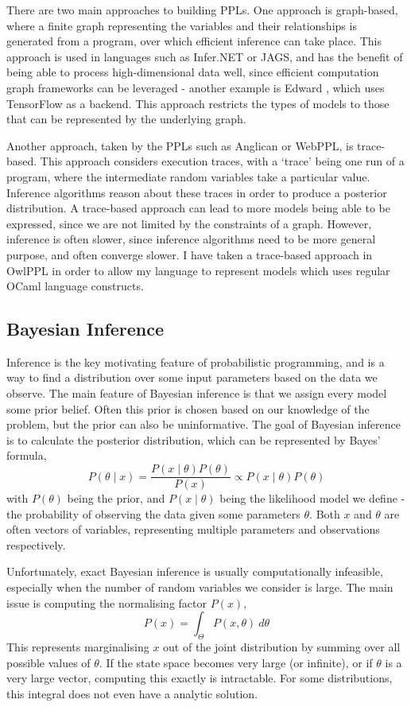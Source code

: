 There are two main approaches to building PPLs. One approach is graph-based, where a finite graph representing the variables and their relationships is generated from a program, over which efficient inference can take place. This approach is used in languages such as Infer.NET or JAGS, and has the benefit of being able to process high-dimensional data well, since efficient computation graph frameworks can be leveraged - another example is Edward \cite{edward}, which uses TensorFlow as a backend. This approach restricts the types of models to those that can be represented by the underlying graph.
		
Another approach, taken by the PPLs such as Anglican or WebPPL, is trace-based. This approach considers execution traces, with a `trace' being one run of a program, where the intermediate random variables take a particular value. Inference algorithms reason about these traces in order to produce a posterior distribution. A trace-based approach can lead to more models being able to be expressed, since we are not limited by the constraints of a graph. However, inference is often slower, since inference algorithms need to be more general purpose, and often converge slower. I have taken a trace-based approach in OwlPPL in order to allow my language to represent models which uses regular OCaml language constructs.
			
\subsection{Bayesian Inference}
Inference is the key motivating feature of probabilistic programming, and is a way to find a distribution over some input parameters based on the data we observe. The main feature of Bayesian inference is that we assign every model some prior belief. Often this prior is chosen based on our knowledge of the problem, but the prior can also be uninformative. The goal of Bayesian inference is to calculate the posterior distribution, which can be represented by Bayes' formula,
% 
\[P(\theta\mid x)=\frac{P(x\mid\theta)P(\theta)}{P(x)}\propto{{P(x\mid\theta)P(\theta)}} \]
% 
with $P(\theta)$ being the prior, and $P(x\mid \theta)$ being the likelihood model we define - the probability of observing the data given some parameters $\theta$. Both $x$ and $\theta$ are often vectors of variables, representing multiple parameters and observations respectively.
		
Unfortunately, exact Bayesian inference is usually computationally infeasible, especially when the number of random variables  we consider is large. The main issue is computing the normalising factor $P(x)$,
\[P(x)=\int_{\Theta}P(x,\theta)~d\theta\]
This represents marginalising $x$ out of the joint distribution by summing over all possible values of $\theta$. If the state space becomes very large (or infinite), or if $\theta$ is a very large vector, computing this exactly is intractable. For some distributions, this integral does not even have a analytic solution.
	
